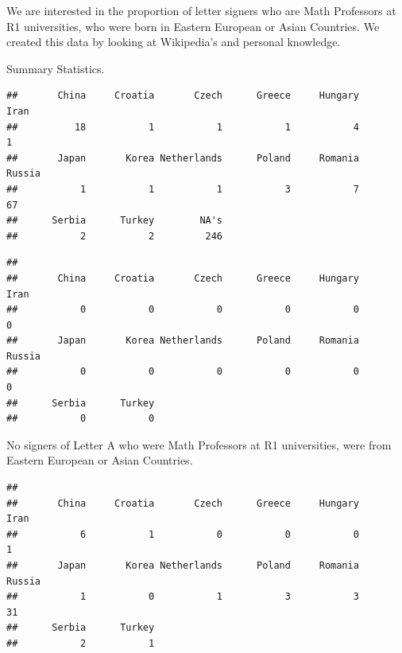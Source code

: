\documentclass[]{article}
\newenvironment{Shaded}{\begin{snugshade}}{\end{snugshade}}
\newcommand{\KeywordTok}[1]{\textcolor[rgb]{0.13,0.29,0.53}{\textbf{#1}}}
\newcommand{\NormalTok}[1]{#1}
\newcommand{\OperatorTok}[1]{\textcolor[rgb]{0.81,0.36,0.00}{\textbf{#1}}}
\newcommand{\StringTok}[1]{\textcolor[rgb]{0.31,0.60,0.02}{#1}}
\begin{document}
We are interested in the proportion of letter signers who are Math
Professors at R1 universities, who were born in Eastern European or
Asian Countries. We created this data by looking at Wikipedia's and
personal knowledge.

Summary Statistics.

\begin{verbatim}
##       China     Croatia       Czech      Greece     Hungary        Iran 
##          18           1           1           1           4           1 
##       Japan       Korea Netherlands      Poland     Romania      Russia 
##           1           1           1           3           7          67 
##      Serbia      Turkey        NA's 
##           2           2         246
\end{verbatim}

\begin{Shaded}
\end{Shaded}

\begin{verbatim}
## 
##       China     Croatia       Czech      Greece     Hungary        Iran 
##           0           0           0           0           0           0 
##       Japan       Korea Netherlands      Poland     Romania      Russia 
##           0           0           0           0           0           0 
##      Serbia      Turkey 
##           0           0
\end{verbatim}

No signers of Letter A who were Math Professors at R1 universities, were
from Eastern European or Asian Countries.

\begin{Shaded}
\end{Shaded}

\begin{verbatim}
## 
##       China     Croatia       Czech      Greece     Hungary        Iran 
##           6           1           0           0           0           1 
##       Japan       Korea Netherlands      Poland     Romania      Russia 
##           1           0           1           3           3          31 
##      Serbia      Turkey 
##           2           1
\end{verbatim}
\end{document}
